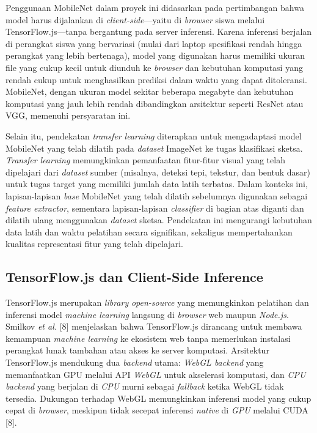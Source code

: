 Penggunaan MobileNet dalam proyek ini didasarkan pada pertimbangan bahwa model harus dijalankan di \textit{client-side}—yaitu di \textit{browser} siswa melalui TensorFlow.js—tanpa bergantung pada server inferensi. Karena inferensi berjalan di perangkat siswa yang bervariasi (mulai dari laptop spesifikasi rendah hingga perangkat yang lebih bertenaga), model yang digunakan harus memiliki ukuran file yang cukup kecil untuk diunduh ke \textit{browser} dan kebutuhan komputasi yang rendah cukup untuk menghasilkan prediksi dalam waktu yang dapat ditoleransi. MobileNet, dengan ukuran model sekitar beberapa megabyte dan kebutuhan komputasi yang jauh lebih rendah dibandingkan arsitektur seperti ResNet atau VGG, memenuhi persyaratan ini.

Selain itu, pendekatan \textit{transfer learning} diterapkan untuk mengadaptasi model MobileNet yang telah dilatih pada \textit{dataset} ImageNet ke tugas klasifikasi sketsa. \textit{Transfer learning} memungkinkan pemanfaatan fitur-fitur visual yang telah dipelajari dari \textit{dataset} sumber (misalnya, deteksi tepi, tekstur, dan bentuk dasar) untuk tugas target yang memiliki jumlah data latih terbatas. Dalam konteks ini, lapisan-lapisan \textit{base} MobileNet yang telah dilatih sebelumnya digunakan sebagai \textit{feature extractor}, sementara lapisan-lapisan \textit{classifier} di bagian atas diganti dan dilatih ulang menggunakan \textit{dataset} sketsa. Pendekatan ini mengurangi kebutuhan data latih dan waktu pelatihan secara signifikan, sekaligus mempertahankan kualitas representasi fitur yang telah dipelajari.

\subsection{TensorFlow.js dan Client-Side Inference}
\label{subsec:tfjs-client-side}

TensorFlow.js merupakan \textit{library} \textit{open-source} yang memungkinkan pelatihan dan inferensi model \textit{machine learning} langsung di \textit{browser} web maupun \textit{Node.js}. Smilkov \textit{et al.} [8] menjelaskan bahwa TensorFlow.js dirancang untuk membawa kemampuan \textit{machine learning} ke ekosistem web tanpa memerlukan instalasi perangkat lunak tambahan atau akses ke server komputasi. Arsitektur TensorFlow.js mendukung dua \textit{backend} utama: \textit{WebGL backend} yang memanfaatkan GPU melalui API \textit{WebGL} untuk akselerasi komputasi, dan \textit{CPU backend} yang berjalan di \textit{CPU} murni sebagai \textit{fallback} ketika WebGL tidak tersedia. Dukungan terhadap WebGL memungkinkan inferensi model yang cukup cepat di \textit{browser}, meskipun tidak secepat inferensi \textit{native} di \textit{GPU} melalui CUDA [8].

